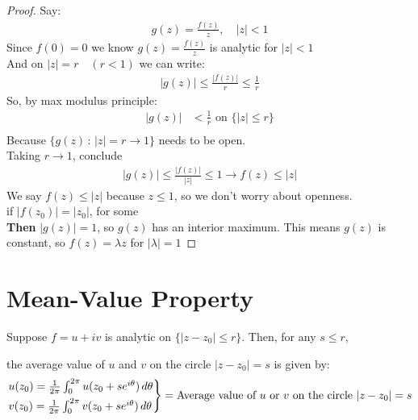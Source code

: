 \begin{proof}
    Say:
    \begin{align*}
        g(z) = \frac{f(z)}{z}, \quad |z| < 1
    \end{align*}
    Since $f(0) = 0$ we know $g(z) = \frac{f(z)}{z}$ is analytic for $|z| < 1$\\
    And on $|z| = r \quad (r < 1)$ we can write:
    \begin{align}
        |g(z)| \leq \frac{|f(z)|}{r} \leq \frac{1}{r}
    \end{align}
    So, by max modulus principle:
    \begin{align*}
        |g(z)| & < \frac{1}r \text{ on } \{|z| \leq r\} \\
    \end{align*}
    Because $\{g(z) \, : \, |z| = r \to 1\}$ needs to be open.\\
    Taking $r \to 1$, conclude
    \begin{align*}
        |g(z)| \leq \frac{|f(z)|}{|z|} \leq 1 \to f(z) \leq |z|
    \end{align*}
    We say $f(z) \leq |z|$ because $z \leq 1$, so we don't worry about openness.\\
    if $|f(z_0)| = |z_0|$, for some\\
    \textbf{Then} $|g(z)| = 1$, so $g(z)$ has an interior maximum. This means $g(z)$ is constant, so $f(z) = \lambda z$ for $|\lambda| = 1$
\end{proof}

\section{Mean-Value Property}
\begin{theorem}
    Suppose \( f = u + iv \) is analytic on \( \{ |z - z_0| \leq r \} \). Then, for any \( s \leq r \),

    the average value of \( u \) and \( v \) on the circle \( |z - z_0| = s \) is given by:
    \[
        \begin{rcases}
            u(z_0) = \frac{1}{2\pi} \int_{0}^{2\pi} u(z_0 + se^{i\theta}) \, d\theta \\
            v(z_0) = \frac{1}{2\pi} \int_{0}^{2\pi} v(z_0 + se^{i\theta}) \, d\theta
        \end{rcases} = \text{Average value of } u \text{ or } v \text{ on the circle } |z - z_0| = s
    \]
\end{theorem}


